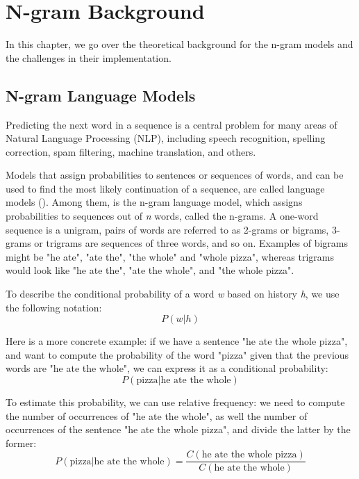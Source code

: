 \documentclass[sigplan,screen]{acmart}
\begin{document}
\section{N-gram Background}
In this chapter, we go over the theoretical background for the n-gram models and the challenges in their implementation.

\subsection{N-gram Language Models}
Predicting the next word in a sequence is a central problem for many areas of Natural Language Processing (NLP), including speech recognition, spelling correction, spam filtering, machine translation, and others.

Models that assign probabilities to sentences or sequences of words, and can be used to find the most likely continuation of a sequence, are called language models (\cite{Jura09a}). Among them, is the n-gram language model, which assigns probabilities to sequences out of \textit{n} words, called the n-grams. A one-word sequence is a unigram, pairs of words are referred to as 2-grams or bigrams, 3-grams or trigrams are sequences of three words, and so on. Examples of bigrams might be "he ate", "ate the", "the whole" and "whole pizza", whereas trigrams would look like "he ate the", "ate the whole", and "the whole pizza".

To describe the conditional probability of a word \textit{w} based on history \textit{h}, we use the following notation:
\begin{equation}
    P(w|h)
\end{equation}

Here is a more concrete example: if we have a sentence "he ate the whole pizza", and want to compute the probability of the word "pizza" given that the previous words are "he ate the whole", we can express it as a conditional probability:
\begin{equation}
    P(\text{pizza}|\text{he ate the whole})
\end{equation}

To estimate this probability, we can use relative frequency: we need to compute the number of occurrences of "he ate the whole", as well the number of occurrences of the sentence "he ate the whole pizza", and divide the latter by the former:
\begin{equation}
    P(\text{pizza}|\text{he ate the whole})=\frac{C(\text{he ate the whole pizza})}{C(\text{he ate the whole})}
\end{equation}
\end{document}
